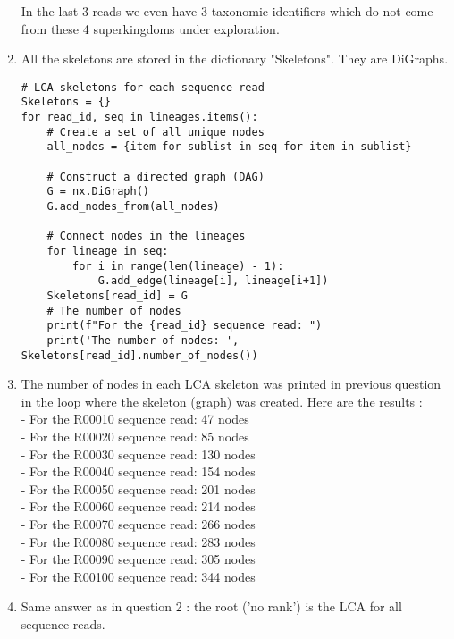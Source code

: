 \documentclass[12 pt,a4paper]{article}
\begin{document}
\begin{enumerate}
In the last 3 reads we even have 3 taxonomic identifiers which do not come from these 4 superkingdoms under exploration.  

\item 
All the skeletons are stored in the dictionary "Skeletons". They are DiGraphs.
\begin{verbatim}
# LCA skeletons for each sequence read
Skeletons = {}
for read_id, seq in lineages.items():
    # Create a set of all unique nodes
    all_nodes = {item for sublist in seq for item in sublist}

    # Construct a directed graph (DAG)
    G = nx.DiGraph()
    G.add_nodes_from(all_nodes)

    # Connect nodes in the lineages
    for lineage in seq:
        for i in range(len(lineage) - 1):
            G.add_edge(lineage[i], lineage[i+1])
    Skeletons[read_id] = G
    # The number of nodes
    print(f"For the {read_id} sequence read: ")
    print('The number of nodes: ', Skeletons[read_id].number_of_nodes())
\end{verbatim}
\item 
The number of nodes in each LCA skeleton was printed in previous question in the loop where the skeleton (graph) was created. Here are the results : \\
- For the R00010 sequence read: 47 nodes \\
- For the R00020 sequence read: 85 nodes \\
- For the R00030 sequence read: 130 nodes \\
- For the R00040 sequence read: 154 nodes \\
- For the R00050 sequence read: 201 nodes \\
- For the R00060 sequence read: 214 nodes\\
- For the R00070 sequence read: 266 nodes\\
- For the R00080 sequence read: 283 nodes \\
- For the R00090 sequence read: 305 nodes \\
- For the R00100 sequence read: 344 nodes \\

\item Same answer as in question 2 : the root ('no rank') is the LCA for all sequence reads. 
\end {enumerate}
\end{document}
